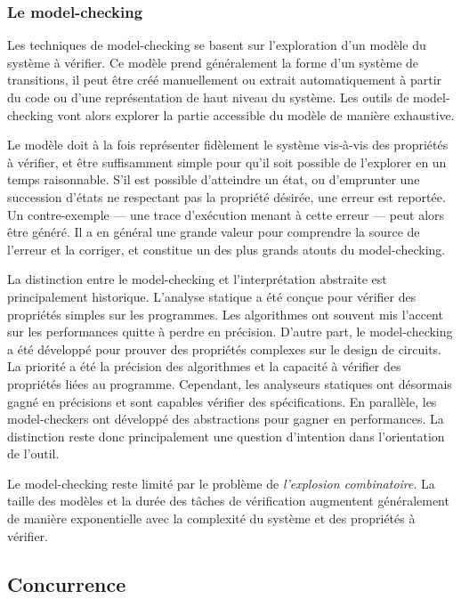\subsubsection{Le model-checking}

Les techniques de model-checking se basent sur l'exploration d'un modèle du
système à vérifier. Ce modèle prend généralement la forme d'un système de
transitions, il peut être créé manuellement ou extrait automatiquement à partir
du code ou d'une représentation de haut niveau du système. Les outils de
model-checking vont alors explorer la partie accessible du modèle de manière
exhaustive.

Le modèle doit à la fois représenter fidèlement le système vis-à-vis des
propriétés à vérifier, et être suffisamment simple pour qu'il soit
possible de l'explorer en un temps raisonnable. S’il est possible
d'atteindre un état, ou d'emprunter une succession d'états ne respectant
pas la propriété désirée, une erreur est reportée. Un contre-exemple ---
une trace d'exécution menant à cette erreur --- peut alors être généré.
Il a en général une grande valeur pour comprendre la source de l'erreur
et la corriger, et constitue un des plus grands atouts du model-checking.

La distinction entre le model-checking et l'interprétation abstraite est
principalement historique. L'analyse statique a été conçue pour vérifier
des propriétés simples sur les programmes. Les algorithmes ont souvent
mis l'accent sur les performances quitte à perdre en précision. D'autre
part, le model-checking a été développé pour prouver des propriétés
complexes sur le design de circuits. La priorité a été la précision des
algorithmes et la capacité à vérifier des propriétés liées au
programme. Cependant, les analyseurs statiques ont désormais gagné en
précisions et sont capables vérifier des spécifications. En parallèle, les
model-checkers ont développé des abstractions pour gagner en
performances. La distinction reste donc principalement une question
d'intention dans l'orientation de l'outil.

Le model-checking reste limité par le problème de \emph{l'explosion
combinatoire}. La taille des modèles et la durée des tâches de
vérification augmentent généralement de manière exponentielle avec la
complexité du système et des propriétés à vérifier.

\subsection{Concurrence}

